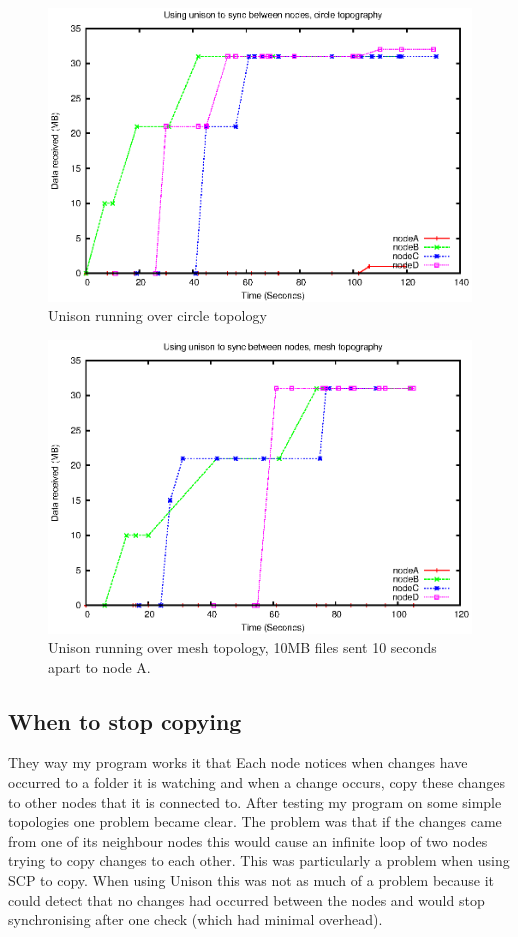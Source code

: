 \documentclass[12pt]{article}
\begin{document}
\begin{figure}[hb!]
    \centering
    \includegraphics[height=0.5\textheight]{images/circ-uni-almost.eps}
    \caption{Unison running over circle topology}
    \label{fig:full_circ_uni}
\end{figure}
\begin{figure}[ht!]
    \centering
    \includegraphics[height=0.5\textheight]{images/mesh-uni-almost.eps}
    \caption{Unison running over mesh topology, 10MB files sent 10 seconds
    apart to node A.}
    \label{fig:full_mesh_uni}
\end{figure}

\newpage
\subsection{When to stop copying}
They way my program works it that Each node notices when changes
have occurred to a folder it is watching and when a change occurs,
copy these changes to other nodes that it is connected to.
After testing my program on some simple topologies one problem became
clear. 
The problem was that if the changes
came from one of its neighbour nodes this would cause an infinite loop
of two nodes trying to copy changes to each other. This was particularly 
a problem when using SCP to copy. When using Unison this was not as much of
a problem because it could detect that no changes had occurred between the nodes
and would stop synchronising after one check (which had minimal overhead).
\end{document}
